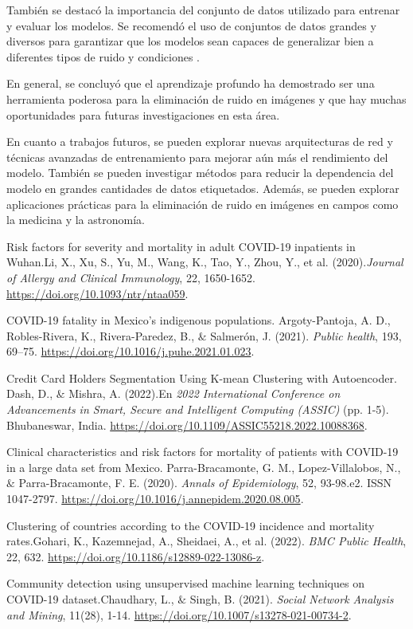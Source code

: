 \documentclass[a4paper,
               ]{jacow}
\begin{document}
También se destacó la importancia del conjunto de datos utilizado para entrenar y evaluar los modelos. Se recomendó el uso de conjuntos de datos grandes y diversos para garantizar que los modelos sean capaces de generalizar bien a diferentes tipos de ruido y condiciones \cite{zhang2018learning}.

En general, se concluyó que el aprendizaje profundo ha demostrado ser una herramienta poderosa para la eliminación de ruido en imágenes y que hay muchas oportunidades para futuras investigaciones en esta área.

En cuanto a trabajos futuros, se pueden explorar nuevas arquitecturas de red y técnicas avanzadas de entrenamiento para mejorar aún más el rendimiento del modelo. También se pueden investigar métodos para reducir la dependencia del modelo en grandes cantidades de datos etiquetados. Además, se pueden explorar aplicaciones prácticas para la eliminación de ruido en imágenes en campos como la medicina y la astronomía.
%
%
%
	{\printbibliography}%
	{
	\begin{thebibliography}{20} %
        Risk factors for severity and mortality in adult COVID-19 inpatients in Wuhan.Li, X., Xu, S., Yu, M., Wang, K., Tao, Y., Zhou, Y., et al. (2020).\textit{Journal of Allergy and Clinical Immunology}, 22, 1650-1652. \url{https://doi.org/10.1093/ntr/ntaa059}.

        COVID-19 fatality in Mexico's indigenous populations. Argoty-Pantoja, A. D., Robles-Rivera, K., Rivera-Paredez, B., $\&$ Salmerón, J. (2021). \textit{Public health}, 193, 69–75. \url{https://doi.org/10.1016/j.puhe.2021.01.023}.

        Credit Card Holders Segmentation Using K-mean Clustering with Autoencoder. Dash, D., $\&$  Mishra, A. (2022).En \textit{2022 International Conference on Advancements in Smart, Secure and Intelligent Computing (ASSIC)} (pp. 1-5). Bhubaneswar, India. \url{https://doi.org/10.1109/ASSIC55218.2022.10088368}.

        Clinical characteristics and risk factors for mortality of patients with COVID-19 in a large data set from Mexico. Parra-Bracamonte, G. M., Lopez-Villalobos, N., $\&$ Parra-Bracamonte, F. E. (2020). \textit{Annals of Epidemiology}, 52, 93-98.e2. ISSN 1047-2797. \url{https://doi.org/10.1016/j.annepidem.2020.08.005}.


        Clustering of countries according to the COVID-19 incidence and mortality rates.Gohari, K., Kazemnejad, A., Sheidaei, A., et al. (2022). \textit{BMC Public Health}, 22, 632. \url{https://doi.org/10.1186/s12889-022-13086-z}.


        Community detection using unsupervised machine learning techniques on COVID-19 dataset.Chaudhary, L., $\&$ Singh, B. (2021). \textit{Social Network Analysis and Mining}, 11(28), 1-14. \url{https://doi.org/10.1007/s13278-021-00734-2}.



	\end{thebibliography}
} %
%
%

\end{document}
